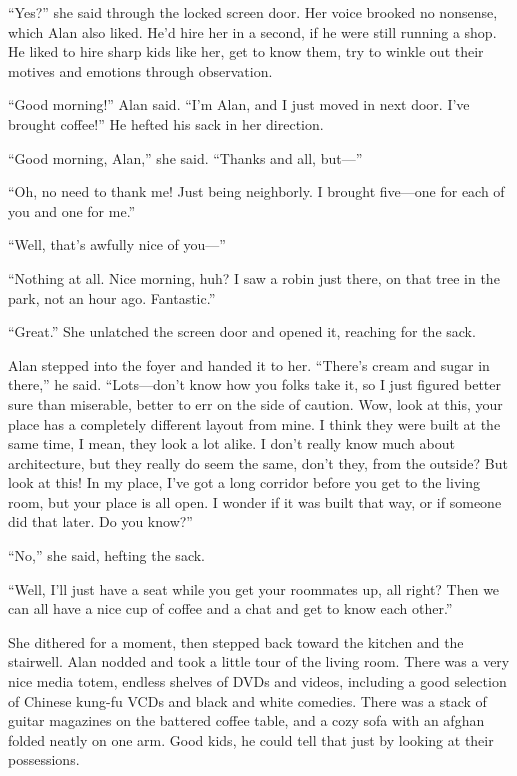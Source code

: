 \documentclass{article}
\begin{document}
``Yes?'' she said through the locked screen door.  Her voice brooked
no nonsense, which Alan also liked.  He'd hire her in a second, if he
were still running a shop.  He liked to hire sharp kids like her, get
to know them, try to winkle out their motives and emotions through
observation.

``Good morning!'' Alan said.  ``I'm Alan, and I just moved in next
door.  I've brought coffee!'' He hefted his sack in her direction.

``Good morning, Alan,'' she said.  ``Thanks and all, but---''

``Oh, no need to thank me!  Just being neighborly.  I brought
five---one for each of you and one for me.''

``Well, that's awfully nice of you---''

``Nothing at all.  Nice morning, huh?  I saw a robin just there, on
that tree in the park, not an hour ago.  Fantastic.''

``Great.'' She unlatched the screen door and opened it, reaching for
the sack.

Alan stepped into the foyer and handed it to her.  ``There's cream and
sugar in there,'' he said.  ``Lots---don't know how you folks take it,
so I just figured better sure than miserable, better to err on the
side of caution.  Wow, look at this, your place has a completely
different layout from mine.  I think they were built at the same time,
I mean, they look a lot alike.  I don't really know much about
architecture, but they really do seem the same, don't they, from the
outside?  But look at this!  In my place, I've got a long corridor
before you get to the living room, but your place is all open.  I
wonder if it was built that way, or if someone did that later.  Do you
know?''

``No,'' she said, hefting the sack.

``Well, I'll just have a seat while you get your roommates up, all
right?  Then we can all have a nice cup of coffee and a chat and get
to know each other.''

She dithered for a moment, then stepped back toward the kitchen and
the stairwell.  Alan nodded and took a little tour of the living room. 
There was a very nice media totem, endless shelves of DVDs and videos,
including a good selection of Chinese kung-fu VCDs and black and white
comedies.  There was a stack of guitar magazines on the battered
coffee table, and a cozy sofa with an afghan folded neatly on one arm. 
Good kids, he could tell that just by looking at their possessions.
\end{document}

